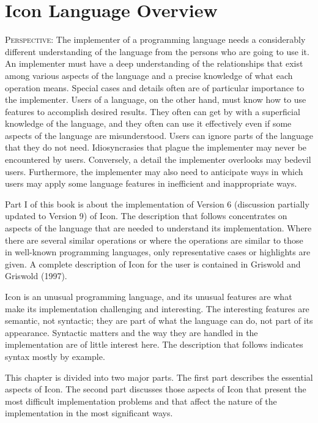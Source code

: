 \chapter{Icon Language Overview}
\label{ILO-Chapter}

\textsc{Perspective}: The implementer of a programming language needs
a considerably different understanding of the language from the
persons who are going to use it. An implementer must have a deep
understanding of the relationships that exist among various aspects of
the language and a precise knowledge of what each operation
means. Special cases and details often are of particular importance to
the implementer. Users of a language, on the other hand, must know how
to use features to accomplish desired results. They often can get by
with a superficial knowledge of the language, and they often can use
it effectively even if some aspects of the language are
misunderstood. Users can ignore parts of the language that they do not
need. Idiosyncrasies that plague the implementer may never be
encountered by users.  Conversely, a detail the implementer overlooks
may bedevil users. Furthermore, the implementer may also need to
anticipate ways in which users may apply some language features in
inefficient and inappropriate ways.

Part I of this book is about the implementation of Version 6
(discussion partially updated to Version 9) of Icon. The description
that follows concentrates on aspects of the language that are needed
to understand its implementation. Where there are several similar
operations or where the operations are similar to those in well-known
programming languages, only representative cases or highlights are
given. A complete description of Icon for the user is contained in
Griswold and Griswold (1997).

Icon is an unusual programming language, and its unusual features are
what make its implementation challenging and interesting. The
interesting features are semantic, not syntactic; they are part of
what the language can do, not part of its appearance. Syntactic
matters and the way they are handled in the implementation are of
little interest here.  The description that follows indicates syntax
mostly by example.

This chapter is divided into two major parts. The first part describes
the essential aspects of Icon. The second part discusses those aspects
of Icon that present the most difficult implementation problems and
that affect the nature of the implementation in the most significant
ways.

